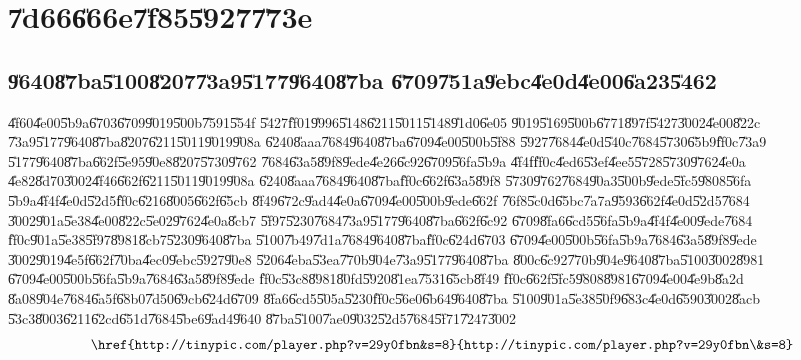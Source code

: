 \documentclass[12pt,a4paper]{article}
\begin{document}
\section{\U{7d66}\U{666e}\U{7f85}\U{5927}\U{773e}}

\subsection{\U{9640}\U{87ba}\U{5100}\U{8207}\U{73a9}\U{5177}\U{9640}\U{87ba}%
\U{6709}\U{751a}\U{9ebc}\U{4e0d}\U{4e00}\U{6a23}\U{5462}}

\bigskip

\U{4f60}\U{4e00}\U{5b9a}\U{6703}\U{6709}\U{9019}\U{500b}\U{7591}\U{554f}%
\U{5427}\U{ff01}\U{9996}\U{5148}\U{6211}\U{5011}\U{5148}\U{91d0}\U{6e05}%
\U{9019}\U{5169}\U{500b}\U{6771}\U{897f}\U{5427}\U{3002}\U{4e00}\U{822c}%
\U{73a9}\U{5177}\U{9640}\U{87ba}\U{8207}\U{6211}\U{5011}\U{9019}\U{908a}%
\U{6240}\U{8aaa}\U{7684}\U{9640}\U{87ba}\U{6709}\U{4e00}\U{500b}\U{5f88}%
\U{5927}\U{7684}\U{4e0d}\U{540c}\U{7684}\U{5730}\U{65b9}\U{ff0c}\U{73a9}%
\U{5177}\U{9640}\U{87ba}\U{662f}\U{5e95}\U{90e8}\U{8207}\U{5730}\U{9762}%
\U{7684}\U{63a5}\U{89f8}\U{9ede}\U{4e26}\U{6c92}\U{6709}\U{56fa}\U{5b9a}%
\U{4f4f}\U{ff0c}\U{4ed6}\U{53ef}\U{4ee5}\U{5728}\U{5730}\U{9762}\U{4e0a}%
\U{4e82}\U{8d70}\U{3002}\U{4f46}\U{662f}\U{6211}\U{5011}\U{9019}\U{908a}%
\U{6240}\U{8aaa}\U{7684}\U{9640}\U{87ba}\U{ff0c}\U{662f}\U{63a5}\U{89f8}%
\U{5730}\U{9762}\U{7684}\U{90a3}\U{500b}\U{9ede}\U{5fc5}\U{9808}\U{56fa}%
\U{5b9a}\U{4f4f}\U{4e0d}\U{52d5}\U{ff0c}\U{6216}\U{8005}\U{662f}\U{65cb}%
\U{8f49}\U{672c}\U{9ad4}\U{4e0a}\U{6709}\U{4e00}\U{500b}\U{9ede}\U{662f}%
\U{76f8}\U{5c0d}\U{65bc}\U{7a7a}\U{9593}\U{662f}\U{4e0d}\U{52d5}\U{7684}%
\U{3002}\U{901a}\U{5e38}\U{4e00}\U{822c}\U{5e02}\U{9762}\U{4e0a}\U{8cb7}%
\U{5f97}\U{5230}\U{7684}\U{73a9}\U{5177}\U{9640}\U{87ba}\U{662f}\U{6c92}%
\U{6709}\U{8fa6}\U{6cd5}\U{56fa}\U{5b9a}\U{4f4f}\U{4e00}\U{9ede}\U{7684}%
\U{ff0c}\U{901a}\U{5e38}\U{5f97}\U{8981}\U{8cb7}\U{5230}\U{9640}\U{87ba}%
\U{5100}\U{7b49}\U{7d1a}\U{7684}\U{9640}\U{87ba}\U{ff0c}\U{624d}\U{6703}%
\U{6709}\U{4e00}\U{500b}\U{56fa}\U{5b9a}\U{7684}\U{63a5}\U{89f8}\U{9ede}%
\U{3002}\U{9019}\U{4e5f}\U{662f}\U{70ba}\U{4ec0}\U{9ebc}\U{5927}\U{90e8}%
\U{5206}\U{4eba}\U{53ea}\U{770b}\U{904e}\U{73a9}\U{5177}\U{9640}\U{87ba}%
\U{800c}\U{6c92}\U{770b}\U{904e}\U{9640}\U{87ba}\U{5100}\U{3002}\U{8981}%
\U{6709}\U{4e00}\U{500b}\U{56fa}\U{5b9a}\U{7684}\U{63a5}\U{89f8}\U{9ede}%
\U{ff0c}\U{53c8}\U{8981}\U{80fd}\U{5920}\U{81ea}\U{7531}\U{65cb}\U{8f49}%
\U{ff0c}\U{662f}\U{5fc5}\U{9808}\U{8981}\U{6709}\U{4e00}\U{4e9b}\U{8a2d}%
\U{8a08}\U{904e}\U{7684}\U{6a5f}\U{68b0}\U{7d50}\U{69cb}\U{624d}\U{6709}%
\U{8fa6}\U{6cd5}\U{505a}\U{5230}\U{ff0c}\U{56e0}\U{6b64}\U{9640}\U{87ba}%
\U{5100}\U{901a}\U{5e38}\U{50f9}\U{683c}\U{4e0d}\U{6590}\U{3002}\U{8acb}%
\U{53c3}\U{8003}\U{6211}\U{62cd}\U{651d}\U{7684}\U{5be6}\U{9ad4}\U{9640}%
\U{87ba}\U{5100}\U{7ae0}\U{9032}\U{52d5}\U{7684}\U{5f71}\U{7247}\U{3002}%
\begin{equation*}
\text{\href{http://tinypic.com/player.php?v=29y0fbn&s=8}{%
http://tinypic.com/player.php?v=29y0fbn\&s=8}}
\end{equation*}
\end{document}
